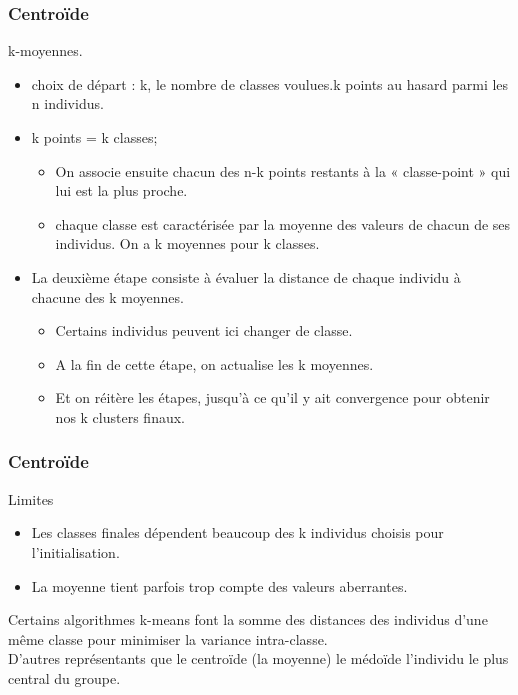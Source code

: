 \begin{frame}
  \frametitle{Centroïde}
  k-moyennes. 
  
\begin{itemize}
 \item {} choix de départ : k, le nombre de classes voulues.k points au hasard parmi les n individus.
  \item {} k points = k classes;  
  \begin{itemize}
  \item {} On associe ensuite chacun des n-k points restants à la « classe-point » qui lui est la plus proche.
  \item {} chaque classe est caractérisée par la moyenne des valeurs de chacun de ses individus. On a k moyennes pour k classes.
  
  \end{itemize}
  \item {} La deuxième étape consiste à évaluer la distance de chaque individu à chacune des k moyennes.   
  \begin{itemize}
  		\item {} Certains individus peuvent ici changer de classe.
  		\item {} A la fin de cette étape, on actualise les k moyennes.
  		\item {} Et on réitère les étapes, jusqu’à ce qu’il y ait convergence pour obtenir nos k clusters finaux. 
  \end{itemize}
  \end{itemize}
 \end{frame}
 
 \begin{frame}
  \frametitle{Centroïde}
Limites
\begin{itemize}
  		\item {} Les classes finales dépendent beaucoup des k individus choisis pour l’initialisation. 
  		\item {} La moyenne tient parfois trop compte des valeurs aberrantes.
  \end{itemize}


 Certains algorithmes k-means font la somme des distances des individus d'une même classe pour minimiser la variance intra-classe.\\


 D’autres représentants que le centroïde (la moyenne)  le médoïde l'individu le plus central du groupe.

  
\end{frame}


